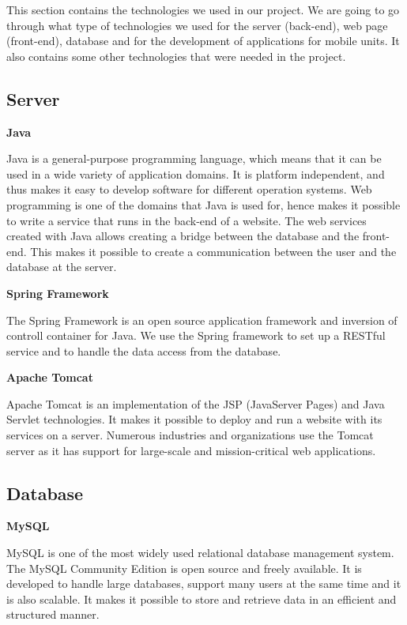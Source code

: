 This section contains the technologies we used in our project.
We are going to go through what type of technologies we used for the server (back-end), web page (front-end), database and for the development of applications for mobile units. 
It also contains some other technologies that were needed in the project.

\subsection{Server}

\textbf{Java}

Java is a general-purpose programming language, which means that it can be used in a wide variety of application domains.
It is platform independent, and thus makes it easy to develop software for different operation systems.
Web programming is one of the domains that Java is used for, hence makes it possible to write a service that runs in the back-end of a website.
The web services created with Java allows creating a bridge between the database and the front-end. 
This makes it possible to create a communication between the user and the database at the server. \cite{Java}

\textbf{Spring Framework}

The Spring Framework is an open source application framework and inversion of controll container for Java. 
We use the Spring framework to set up a RESTful service and to handle the data access from the database. \cite{SpringFramework1}\cite{SpringFramework2}

\textbf{Apache Tomcat}

Apache Tomcat is an implementation of the JSP (JavaServer Pages) and Java Servlet technologies.
It makes it possible to deploy and run a website with its services on a server.
Numerous industries and organizations use the Tomcat server as it has support for large-scale and mission-critical web applications. \cite{ApacheTomcat}

\subsection{Database}

\textbf{MySQL}

MySQL is one of the most widely used relational database management system.
The MySQL Community Edition is open source and freely available.
It is developed to handle large databases, support many users at the same time and it is also scalable.
It makes it possible to store and retrieve data in an efficient and structured manner. \cite{MySQL}

